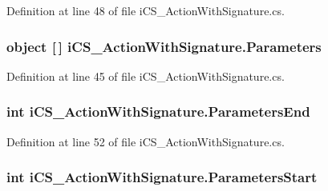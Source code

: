 Definition at line 48 of file i\+C\+S\+\_\+\+Action\+With\+Signature.\+cs.

\hypertarget{classi_c_s___action_with_signature_ab9e87c3f58d73d145776d73f11b7b678}{
\subsubsection[{Parameters}]{\setlength{\rightskip}{0pt plus 5cm}object \mbox{[}$\,$\mbox{]} i\+C\+S\+\_\+\+Action\+With\+Signature.\+Parameters\hspace{0.3cm}{\ttfamily [get]}}}\label{classi_c_s___action_with_signature_ab9e87c3f58d73d145776d73f11b7b678}


Definition at line 45 of file i\+C\+S\+\_\+\+Action\+With\+Signature.\+cs.

\hypertarget{classi_c_s___action_with_signature_a9b1240f8a79c7713110174d00127ac6b}{
\subsubsection[{Parameters\+End}]{\setlength{\rightskip}{0pt plus 5cm}int i\+C\+S\+\_\+\+Action\+With\+Signature.\+Parameters\+End\hspace{0.3cm}{\ttfamily [get]}}}\label{classi_c_s___action_with_signature_a9b1240f8a79c7713110174d00127ac6b}


Definition at line 52 of file i\+C\+S\+\_\+\+Action\+With\+Signature.\+cs.

\hypertarget{classi_c_s___action_with_signature_a2c576ffb477b90777ecb46852a29b556}{
\subsubsection[{Parameters\+Start}]{\setlength{\rightskip}{0pt plus 5cm}int i\+C\+S\+\_\+\+Action\+With\+Signature.\+Parameters\+Start\hspace{0.3cm}{\ttfamily [get]}}}\label{classi_c_s___action_with_signature_a2c576ffb477b90777ecb46852a29b556}


